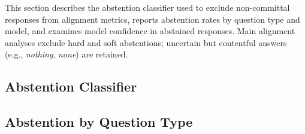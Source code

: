 \documentclass[letterpaper]{article} %
\begin{document}
This section describes the abstention classifier used to exclude non-committal responses from alignment metrics, reports abstention rates by question type and model, and examines model confidence in abstained responses.
Main alignment analyses exclude hard and soft abstentions; uncertain but contentful answers (e.g., \textit{nothing}, \textit{none}) are retained.


\subsection{Abstention Classifier}
\label{app:abstention_classifier}




\subsection{Abstention by Question Type}
\label{app:abstention_by_qtype}



\end{document}
